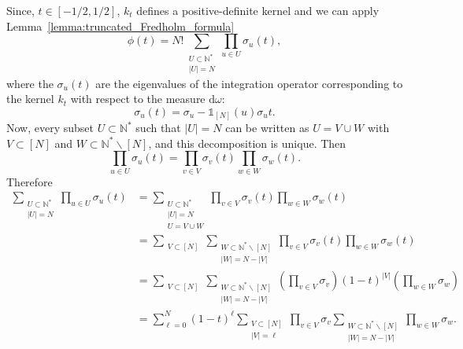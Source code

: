 \documentclass[twoside,11pt]{book}
\numberwithin{theorem}{chapter}
\numberwithin{definition}{chapter}
\numberwithin{proposition}{chapter}
\numberwithin{corollary}{chapter}
\numberwithin{example}{chapter}
\numberwithin{lemma}{chapter}
\numberwithin{assumption}{chapter}
\numberwithin{equation}{chapter}
\numberwithin{figure}{chapter}
\begin{document}
Since, $t \in [-1/2,1/2]$, $k_{t}$ defines a positive-definite kernel and we can apply Lemma~\ref{lemma:truncated_Fredholm_formula}
\begin{equation}
\phi(t) = N!\sum\limits_{\substack{U \subset \mathbb{N}^{*}\\ |U| = N}} \prod\limits_{u \in U} \sigma_{u}(t),
\end{equation}
where the $\sigma_{u}(t)$ are the eigenvalues of the integration operator corresponding to the kernel $k_{t}$ with respect to the measure $\mathrm{d}\omega$:
\begin{equation}
\sigma_{u}(t) = \sigma_{u} - \mathbb{1}_{[N]}(u)\sigma_{u} t.
\end{equation}
Now, every subset $U \subset \mathbb{N}^{*}$ such that $|U| = N$ can be written as $U = V \cup W$ with $V \subset [N]$ and $W \subset \mathbb{N}^{*} \smallsetminus [N]$, and this decomposition is unique. Then
\begin{equation}
\prod\limits_{u \in U}\sigma_{u}(t) = \prod\limits_{v \in V}\sigma_{v}(t) \prod\limits_{w \in W}\sigma_{w}(t).
\end{equation}
Therefore
\begin{align}
    \sum\limits_{\substack{U \subset \mathbb{N}^{*} \\ |U| = N}} \prod\limits_{u \in U}\sigma_{u}(t) & = \sum\limits_{\substack{U \subset \mathbb{N}^{*} \\ |U| = N\\ U = V \cup W}} \prod\limits_{v \in V}\sigma_{v}(t) \prod\limits_{w \in W}\sigma_{w}(t) \\
    & = \sum\limits_{\substack{V \subset [N]}} \sum\limits_{\substack{W \subset \mathbb{N}^{*}\smallsetminus [N]\\ |W| = N-|V|}} \prod\limits_{v \in V}\sigma_{v}(t) \prod\limits_{w \in W}\sigma_{w}(t) \nonumber\\
    & = \sum\limits_{\substack{V \subset [N]}} \sum\limits_{\substack{W \subset \mathbb{N}^{*}\smallsetminus [N]\\ |W| = N-|V|}} (\prod\limits_{v \in V}\sigma_{v})(1-t)^{|V|} (\prod\limits_{w \in W}\sigma_{w}) \nonumber\\
    & =\sum\limits_{\ell =0}^{N} (1-t)^{\ell} \sum\limits_{\substack{V \subset [N]\\|V| = \ell}} \prod\limits_{v \in V}\sigma_{v}  \sum\limits_{\substack{W \subset \mathbb{N}^{*} \smallsetminus[N]\\  |W|= N-|V|}}  \prod\limits_{w \in W}\sigma_{w}.
\end{align}
\end{document}
